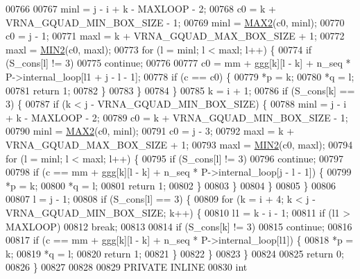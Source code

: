 \begin{DoxyCode}
00766 
00767     minl  = j - i + k - MAXLOOP - 2;
00768     c0    = k + VRNA\_GQUAD\_MIN\_BOX\_SIZE - 1;
00769     minl  = \hyperlink{group__utils_ga33297b3679c713b0c4d897cd0fe3b122}{MAX2}(c0, minl);
00770     c0    = j - 1;
00771     maxl  = k + VRNA\_GQUAD\_MAX\_BOX\_SIZE + 1;
00772     maxl  = \hyperlink{group__utils_gae0b9cd0ce090bd69b951aa73e8fa4f7d}{MIN2}(c0, maxl);
00773     \textcolor{keywordflow}{for} (l = minl; l < maxl; l++) \{
00774       \textcolor{keywordflow}{if} (S\_cons[l] != 3)
00775         \textcolor{keywordflow}{continue};
00776 
00777       c0 = mm + ggg[k][l - k] + n\_seq * P->internal\_loop[l1 + j - l - 1];
00778       \textcolor{keywordflow}{if} (c == c0) \{
00779         *p  = k;
00780         *q  = l;
00781         \textcolor{keywordflow}{return} 1;
00782       \}
00783     \}
00784   \}
00785   k = i + 1;
00786   \textcolor{keywordflow}{if} (S\_cons[k] == 3) \{
00787     \textcolor{keywordflow}{if} (k < j - VRNA\_GQUAD\_MIN\_BOX\_SIZE) \{
00788       minl  = j - i + k - MAXLOOP - 2;
00789       c0    = k + VRNA\_GQUAD\_MIN\_BOX\_SIZE - 1;
00790       minl  = \hyperlink{group__utils_ga33297b3679c713b0c4d897cd0fe3b122}{MAX2}(c0, minl);
00791       c0    = j - 3;
00792       maxl  = k + VRNA\_GQUAD\_MAX\_BOX\_SIZE + 1;
00793       maxl  = \hyperlink{group__utils_gae0b9cd0ce090bd69b951aa73e8fa4f7d}{MIN2}(c0, maxl);
00794       \textcolor{keywordflow}{for} (l = minl; l < maxl; l++) \{
00795         \textcolor{keywordflow}{if} (S\_cons[l] != 3)
00796           \textcolor{keywordflow}{continue};
00797 
00798         \textcolor{keywordflow}{if} (c == mm + ggg[k][l - k] + n\_seq * P->internal\_loop[j - l - 1]) \{
00799           *p  = k;
00800           *q  = l;
00801           \textcolor{keywordflow}{return} 1;
00802         \}
00803       \}
00804     \}
00805   \}
00806 
00807   l = j - 1;
00808   \textcolor{keywordflow}{if} (S\_cons[l] == 3) \{
00809     \textcolor{keywordflow}{for} (k = i + 4; k < j - VRNA\_GQUAD\_MIN\_BOX\_SIZE; k++) \{
00810       l1 = k - i - 1;
00811       \textcolor{keywordflow}{if} (l1 > MAXLOOP)
00812         \textcolor{keywordflow}{break};
00813 
00814       \textcolor{keywordflow}{if} (S\_cons[k] != 3)
00815         \textcolor{keywordflow}{continue};
00816 
00817       \textcolor{keywordflow}{if} (c == mm + ggg[k][l - k] + n\_seq * P->internal\_loop[l1]) \{
00818         *p  = k;
00819         *q  = l;
00820         \textcolor{keywordflow}{return} 1;
00821       \}
00822     \}
00823   \}
00824 
00825   \textcolor{keywordflow}{return} 0;
00826 \}
00827 
00828 
00829 PRIVATE INLINE
00830 \textcolor{keywordtype}{int}

\end{DoxyCode}
